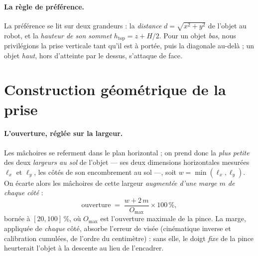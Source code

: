 \paragraph{La règle de préférence.} La préférence se lit sur deux grandeurs : la \emph{distance} $d = \sqrt{x^2 + y^2}$ de l'objet au robot, et la \emph{hauteur de son sommet} $h_{\text{top}} = z + H/2$. Pour un objet \emph{bas}, nous privilégions la prise verticale tant qu'il est à portée, puis la diagonale au-delà ; un objet \emph{haut}, hors d'atteinte par le dessus, s'attaque de face.


\section{Construction géométrique de la prise}
\label{sec:grasp-construction}

\paragraph{L'ouverture, réglée sur la largeur.} Les mâchoires se referment dans le plan horizontal ; on prend donc la \emph{plus petite} des deux \emph{largeurs au sol} de l'objet --- ses deux dimensions horizontales mesurées $\ell_x$ et $\ell_y$, les côtés de son encombrement au sol ---, soit $w = \min(\ell_x, \ell_y)$. On écarte alors les mâchoires de cette largeur \emph{augmentée d'une marge $m$ de chaque côté} :
\[
  \text{ouverture} \;=\; \frac{w + 2\,m}{O_{\max}} \times 100\,\% ,
\]
bornée à $[20, 100]\,\%$, où $O_{\max}$ est l'ouverture maximale de la pince. La marge, appliquée de \emph{chaque} côté, absorbe l'erreur de visée (cinématique inverse et calibration cumulées, de l'ordre du centimètre) : sans elle, le doigt \emph{fixe} de la pince heurterait l'objet à la descente au lieu de l'encadrer.

